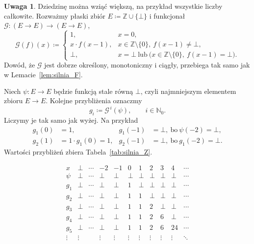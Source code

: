 \documentclass[11pt,a4paper]{article}
\theoremstyle{definition}
\newtheorem{uwaga}[definicja]{Uwaga}
\theoremstyle{plain}
\newcommand{\bt}{\bot}                            %
\begin{document}
\begin{uwaga}\label{uw:silnia_Z}
	Dziedzinę można wziąć większą, na przykład wszystkie liczby całkowite.
	Rozważmy płaski zbiór $E\coloneqq\mathbb Z\cup\{\bt\}$ i funkcjonał
	$\mathcal G:(E\to E)\to(E\to E)$,
	\[
	\mathcal{G}(f)(x)\coloneqq
	\begin{cases}
		1, & x=0,\\
		x\cdot f(x-1), & x\in\mathbb Z\setminus\{0\},\ f(x-1)\neq\bt,\\
		\bt, & x=\bt\ \text{lub}\ \big(x\in\mathbb Z\setminus\{0\},\ f(x-1)=\bt\big).
	\end{cases}
	\]
	Dowód, że $\mathcal G$ jest dobrze określony, monotoniczny i ciągły,
	przebiega tak samo jak w Lemacie~\ref{lem:silnia_F}.
	
	Niech $\psi:E\to E$ będzie funkcją stale równą $\bt$, czyli najmniejszym
	elementem zbioru $E\to E$. Kolejne przybliżenia oznaczmy
	\[
	g_i\coloneqq\mathcal G^{\,i}(\psi),\qquad i\in\mathbb N_0.
	\]
	Liczymy je tak samo jak wyżej. Na przykład
	\[
	\begin{aligned}
		g_1(0)&=1, & g_1(-1)&=\bt,\ \text{bo}\ \psi(-2)=\bt,\\
		g_2(1)&=1\cdot g_1(0)=1, & g_2(-1)&=\bt,\ \text{bo}\ g_1(-2)=\bt.
	\end{aligned}
	\]
	Wartości przybliżeń zbiera Tabela~\ref{tab:silnia_Z}.
	\begin{table}[H]
		\centering
		\[
		\begin{array}{c|cccccccccc}
			x & \bt & \cdots & -2 & -1 & 0 & 1 & 2 & 3 & 4 & \cdots\\
			\hline
			\psi & \bt & \cdots & \bt & \bt & \bt & \bt & \bt & \bt & \bt & \cdots\\
			g_1 & \bt & \cdots & \bt & \bt & 1 & \bt & \bt & \bt & \bt & \cdots\\
			g_2 & \bt & \cdots & \bt & \bt & 1 & 1 & \bt & \bt & \bt & \cdots\\
			g_3 & \bt & \cdots & \bt & \bt & 1 & 1 & 2 & \bt & \bt & \cdots\\
			g_4 & \bt & \cdots & \bt & \bt & 1 & 1 & 2 & 6 & \bt & \cdots\\
			g_5 & \bt & \cdots & \bt & \bt & 1 & 1 & 2 & 6 & 24 & \cdots\\
			\vdots & \vdots & & \vdots & \vdots & \vdots & \vdots & \vdots & \vdots & \vdots & \ddots
		\end{array}
		\]
		\caption{Kolejne przybliżenia $g_i=\mathcal G^{\,i}(\psi)$ silni na zbiorze $E=\mathbb Z\cup\{\bt\}$. Dla argumentów ujemnych wszystkie przybliżenia mają wartość $\bt$.}
		\label{tab:silnia_Z}
	\end{table}
	

\end{uwaga}
\end{document}
